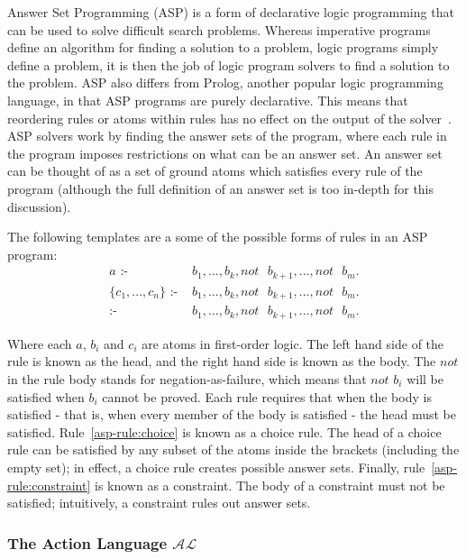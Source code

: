 \documentclass[../interim.tex]{subfiles}
\begin{document}
Answer Set Programming (ASP) is a form of declarative logic programming that can be used to solve difficult search problems. Whereas imperative programs define an algorithm for finding a solution to a problem, logic programs simply define a problem, it is then the job of logic program solvers to find a solution to the problem. ASP also differs from Prolog, another popular logic programming language, in that ASP programs are purely declarative. This means that reordering rules or atoms within rules has no effect on the output of the solver~\cite{asp-primer}. ASP solvers work by finding the answer sets of the program, where each rule in the program imposes restrictions on what can be an answer set. An answer set can be thought of as a set of ground atoms which satisfies every rule of the program (although the full definition of an answer set is too in-depth for this discussion).

The following templates are a some of the possible forms of rules in an ASP program:
\begin{align}
  a \text{ :- }& b_1, ..., b_k, not \text{ } b_{k+1}, ..., not \text{ } b_m. \label{asp-rule:normal}\\
  \{c_1,...,c_n\} \text{ :- }& b_1,...,b_k, not \text{ } b_{k+1}, ..., not \text{ } b_m. \label{asp-rule:choice}\\
  \text{:- }& b_1,...,b_k, not \text{ } b_{k+1}, ..., not \text{ } b_m. \label{asp-rule:constraint}
\end{align}

Where each $a$, $b_i$ and $c_i$ are atoms in first-order logic. The left hand side of the rule is known as the head, and the right hand side is known as the body. The $not$ in the rule body stands for negation-as-failure, which means that $not$ $b_i$ will be satisfied when $b_i$ cannot be proved. Each rule requires that when the body is satisfied - that is, when every member of the body is satisfied - the head must be satisfied. Rule~\ref{asp-rule:choice} is known as a choice rule. The head of a choice rule can be satisfied by any subset of the atoms inside the brackets (including the empty set); in effect, a choice rule creates possible answer sets. Finally, rule~\ref{asp-rule:constraint} is known as a constraint. The body of a constraint must not be satisfied; intuitively, a constraint rules out answer sets.

\subsubsection{The Action Language $\mathcal{AL}$}
\end{document}
